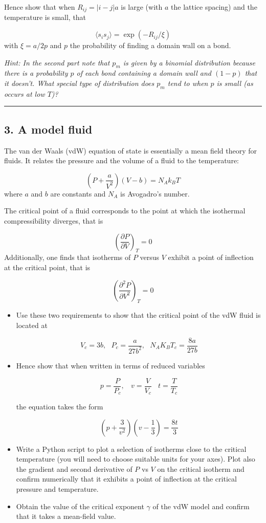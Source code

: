 \documentclass[
  letterpaper,
  DIV=11,
  numbers=noendperiod]{scrreprt}
\begin{document}
Hence show that when \(R_{ij}=|i-j|a\) is large (with \(a\) the lattice
spacing) and the temperature is small, that

\[\langle s_i s_j\rangle =\exp(-R_{ij}/\xi)\] with \(\xi=a/2p\) and
\(p\) the probability of finding a domain wall on a bond.

\emph{Hint: In the second part note that \(p_m\) is given by a binomial
distribution because there is a probability \(p\) of each bond
containing a domain wall and \((1-p)\) that it doesn't. What special
type of distribution does \(p_m\) tend to when \(p\) is small (as occurs
at low \(T\))?}

\begin{center}\rule{0.5\linewidth}{0.5pt}\end{center}

\subsection*{3. A model fluid}\label{a-model-fluid}

The van der Waals (vdW) equation of state is essentially a mean field
theory for fluids. It relates the pressure and the volume of a fluid to
the temperature:

\[\left(P+\frac{a}{V^2}\right)(V-b)=N_Ak_BT\] where \(a\) and \(b\) are
constants and \(N_A\) is Avogadro's number.

The critical point of a fluid corresponds to the point at which the
isothermal compressibility diverges, that is

\[\left(\frac{\partial P}{\partial V}\right)_T=0\] Additionally, one
finds that isotherms of \(P\) versus \(V\) exhibit a point of inflection
at the critical point, that is

\[\left(\frac{\partial^2 P}{\partial V^2}\right)_T=0\]

\begin{itemize}
\item
  Use these two requirements to show that the critical point of the vdW
  fluid is located at

  \[V_c=3b, ~~~ P_c=\frac{a}{27b^2},~~~ N_AK_BT_c=\frac{8a}{27b}\]
\item
  Hence show that when written in terms of reduced variables

  \[p=\frac{P}{P_c}, ~~~~ v=\frac{V}{V_c} ~~~~ t=\frac{T}{T_c}\]

  the equation takes the form

  \[\left(p+\frac{3}{v^2}\right)(v-\frac{1}{3})=\frac{8t}{3}\]
\item
  Write a Python script to plot a selection of isotherms close to the
  critical temperature (you will need to choose suitable units for your
  axes). Plot also the gradient and second derivative of \(P\) vs \(V\)
  on the critical isotherm and confirm numerically that it exhibits a
  point of inflection at the critical pressure and temperature.
\item
  Obtain the value of the critical exponent \(\gamma\) of the vdW model
  and confirm that it takes a mean-field value.
\end{itemize}
\end{document}
